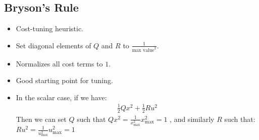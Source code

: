 \subsection{Bryson's Rule}
\begin{itemize}
    \item Cost-tuning heuristic. 
    \item Set diagonal elements of $Q$ and $R$ to $\frac{1}{ \textrm{max value}^2 }$.
    \item Normalizes all cost terms to $1$. 
    \item Good starting point for tuning. 
    \item In the scalar case, if we have: 
    \begin{align}
        \frac{1}{2} Q x^2 + \frac{1}{2} R u^2 
    \end{align}
    Then we can set $Q$ such that $Q x^2 = \frac{1}{x_{\max}^2 } x_{\max}^2 = 1$ , and similarly $R$ such that: $R u^2 = \frac{1}{u_{\max}^2} u_{\max}^2 = 1$
\end{itemize}
